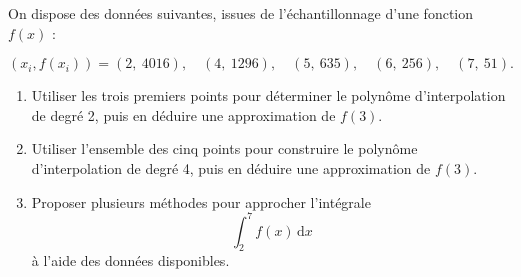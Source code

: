 
On dispose des données suivantes, issues de l'échantillonnage d'une fonction $f(x)$ :

\[
(x_i, f(x_i)) = 
(2,\ 4016),\quad 
(4,\ 1296),\quad 
(5,\ 635),\quad 
(6,\ 256),\quad 
(7,\ 51).
\]

\begin{enumerate}    
    \item Utiliser les trois premiers points pour déterminer le polynôme d'interpolation de degré 2, puis en déduire une approximation de $f(3)$.
    
    \item Utiliser l'ensemble des cinq points pour construire le polynôme d'interpolation de degré 4, puis en déduire une approximation de $f(3)$.
    
    \item Proposer plusieurs méthodes pour approcher l'intégrale
    \[
    \int_2^7 f(x)\, \mathrm{d}x
    \]
    à l'aide des données disponibles. 
\end{enumerate}